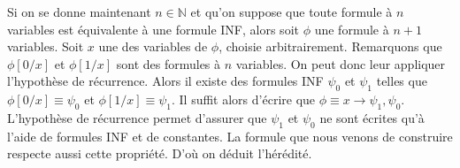 \documentclass[a4paper,11pt]{article}
\begin{document}
		Si on se donne maintenant $n \in \mathbb{N}$ et qu'on suppose que toute formule à $n$ variables est équivalente à une formule INF, alors soit $\phi$ une formule à $n+1$ variables. Soit $x$ une des variables de $\phi$, choisie arbitrairement. Remarquons que $\phi[0/x]$ et $\phi[1/x]$ sont des formules à $n$ variables. On peut donc leur appliquer l'hypothèse de récurrence. Alors il existe des formules INF $\psi_0$ et $\psi_1$ telles que $\phi[0/x] \equiv \psi_0$ et $\phi[1/x] \equiv \psi_1$. Il suffit alors d'écrire que $\phi \equiv x \rightarrow \psi_1, \psi_0$. L'hypothèse de récurrence permet d'assurer que $\psi_1$ et $\psi_0$ ne sont écrites qu'à l'aide de formules INF et de constantes. La formule que nous venons de construire respecte aussi cette propriété. D'où on déduit l'hérédité.
\end{document}
